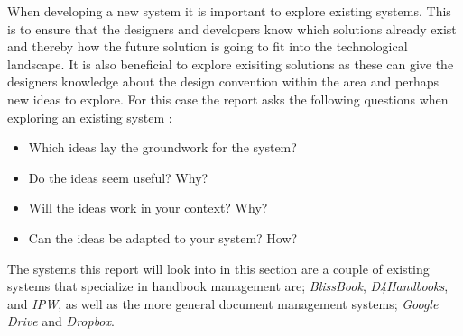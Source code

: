 When developing a new system it is important to explore existing systems.
This is to ensure that the designers and developers know which solutions already exist and thereby how the future solution is going to fit into the technological landscape.
It is also beneficial to explore exisiting solutions as these can give the designers knowledge about the design convention within the area and perhaps new ideas to explore.
For this case the report asks the following questions when exploring an existing system \citep[p.~33]{Rod-Aalborg}:

\begin{itemize}
  \item Which ideas lay the groundwork for the system?
  \item Do the ideas seem useful? Why?
  \item Will the ideas work in your context? Why?
  \item Can the ideas be adapted to your system? How?
\end{itemize}  

The systems this report will look into in this section are a couple of existing systems that specialize in handbook management are; \textit{BlissBook}, \textit{D4Handbooks}, and \textit{IPW}, as well as the more general document management systems; \textit{Google Drive} and \textit{Dropbox}.
